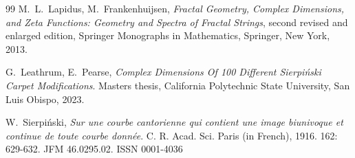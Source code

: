 \documentclass{article}
\theoremstyle{plain}
\numberwithin{equation}{section}
\numberwithin{table}{section}
\numberwithin{figure}{section}
\begin{document}
\begin{thebibliography}{99}
M.~L.~Lapidus, M.~Frankenhuijsen, \emph{Fractal Geometry, Complex Dimensions, and Zeta Functions: Geometry and Spectra of Fractal Strings}, second revised and enlarged edition,
Springer Monographs in Mathematics, Springer, New York, 2013.



G.~Leathrum, E.~Pearse, \emph{Complex Dimensions Of 100 Different Sierpi\'nski Carpet Modifications}.
Masters thesis, California Polytechnic State University, San Luis Obispo, 2023.



W.~Sierpi\'nski, \emph{Sur une courbe cantorienne qui contient une image biunivoque et continue de toute courbe donnée}.
C. R. Acad. Sci. Paris (in French), 1916. 162: 629-632. JFM 46.0295.02. ISSN 0001-4036



















\end{thebibliography}
\end{document}
